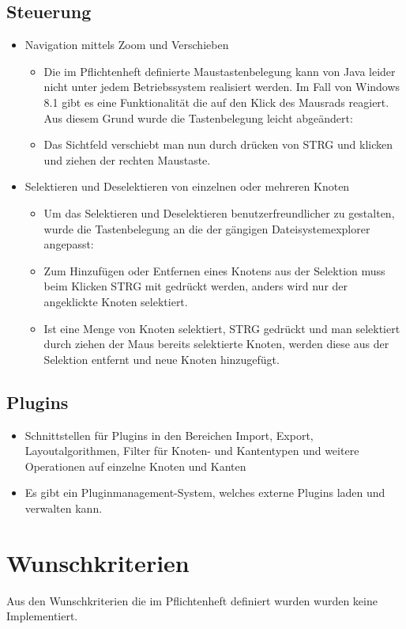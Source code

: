 \subsection{Steuerung}
\begin{itemize}
	\item Navigation mittels Zoom und Verschieben
	\begin{itemize}
		\item Die im Pflichtenheft definierte Maustastenbelegung kann von Java leider nicht unter jedem Betriebssystem realisiert werden. Im Fall von Windows 8.1 gibt es eine Funktionalität die auf den Klick des Mausrads reagiert. Aus diesem Grund wurde die Tastenbelegung leicht abgeändert:
		\item Das Sichtfeld verschiebt man nun durch drücken von STRG und klicken und ziehen der rechten Maustaste.
	\end{itemize}
	\item Selektieren und Deselektieren von einzelnen oder mehreren Knoten
	\begin{itemize}
		\item Um das Selektieren und Deselektieren benutzerfreundlicher zu gestalten, wurde die Tastenbelegung an die der gängigen Dateisystemexplorer angepasst:
		\item Zum Hinzufügen oder Entfernen eines Knotens aus der Selektion muss beim Klicken STRG mit gedrückt werden, anders wird nur der angeklickte Knoten selektiert.
		\item Ist eine Menge von Knoten selektiert, STRG gedrückt und man selektiert durch ziehen der Maus bereits selektierte Knoten, werden diese aus der Selektion entfernt und neue Knoten hinzugefügt.
	\end{itemize}
\end{itemize}

\subsection{Plugins}
\begin{itemize}
	\item Schnittstellen für Plugins in den Bereichen Import, Export, Layoutalgorithmen, Filter für Knoten- und Kantentypen und weitere Operationen auf einzelne Knoten und Kanten
	\item Es gibt ein Pluginmanagement-System, welches externe Plugins laden und verwalten kann.
\end{itemize}

\section{Wunschkriterien}
Aus den Wunschkriterien die im Pflichtenheft definiert wurden wurden keine Implementiert.
